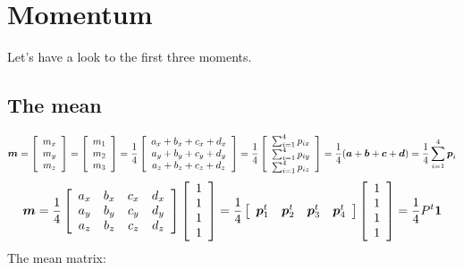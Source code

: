 \documentclass{article}
\begin{document}
\section{Momentum}

Let's have a look to the first three moments.

\subsection{The mean}

$$
 \mbox{\boldmath$m$} =
\left[\begin{array}{c}
 m_x \\
 m_y \\
 m_z
\end{array}\right]
=
\left[\begin{array}{c}
 m_1 \\
 m_2 \\
 m_3
\end{array}\right]
=
\frac{1}{4}
\left[\begin{array}{c}
 a_x + b_x + c_x + d_x \\
 a_y + b_y + c_y + d_y \\
 a_z + b_z + c_z + d_z
\end{array}\right]
=
\frac{1}{4}
\left[\begin{array}{c}
 \sum_{i=1}^{4}p_{ix} \\
 \sum_{i=1}^{4}p_{iy} \\
 \sum_{i=1}^{4}p_{iz}
\end{array}\right]
=
\frac{1}{4}(\mbox{\boldmath$a$} + \mbox{\boldmath$b$} + \mbox{\boldmath$c$} +
 \mbox{\boldmath$d$})
=
\frac{1}{4}\sum_{i=1}^{4}\mbox{\boldmath$p$}_i
$$
$$
 \mbox{\boldmath$m$} =
\frac{1}{4}
\left[\begin{array}{cccc}
 a_x & b_x & c_x & d_x \\
 a_y & b_y & c_y & d_y \\
 a_z & b_z & c_z & d_z
\end{array}\right]
\left[\begin{array}{c}
 1 \\
 1 \\
 1 \\
 1
\end{array}\right]
=
\frac{1}{4}
\left[\begin{array}{cccc}
 \mbox{\boldmath$p$}_1^t & \mbox{\boldmath$p$}_2^t &
 \mbox{\boldmath$p$}_3^t & \mbox{\boldmath$p$}_4^t
\end{array}\right]
\left[\begin{array}{c}
 1 \\
 1 \\
 1 \\
 1
\end{array}\right]
=
\frac{1}{4} P^t \mbox{\boldmath$ 1$}
$$
The mean matrix:
\end{document}
